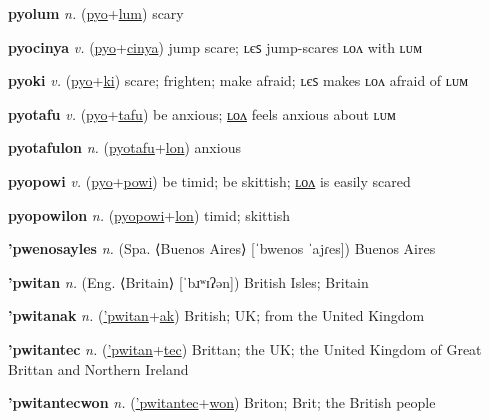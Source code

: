 \textbf{\hypertarget{pyolum}{pyolum}} \textit{n.} (\hyperlink{pyo}{pyo}+\allowbreak \hyperlink{lum}{lum})
scary

\textbf{\hypertarget{pyocinya}{pyocinya}} \textit{v.} (\hyperlink{pyo}{pyo}+\allowbreak \hyperlink{cinya}{cinya})
jump scare; ʟєꜱ jump-scares ʟᴏᴧ with ʟᴜᴍ

\textbf{\hypertarget{pyoki}{pyoki}} \textit{v.} (\hyperlink{pyo}{pyo}+\allowbreak \hyperlink{ki}{ki})
scare; frighten; make afraid; ʟєꜱ makes ʟᴏᴧ afraid of ʟᴜᴍ

\textbf{\hypertarget{pyotafu}{pyotafu}} \textit{v.} (\hyperlink{pyo}{pyo}+\allowbreak \hyperlink{tafu}{tafu})
be anxious; \hyperlink{pyotafulon}{ʟᴏᴧ} feels anxious about ʟᴜᴍ

\textbf{\hypertarget{pyotafulon}{pyotafulon}} \textit{n.} (\hyperlink{pyotafu}{pyotafu}+\allowbreak \hyperlink{lon}{lon})
anxious

\textbf{\hypertarget{pyopowi}{pyopowi}} \textit{v.} (\hyperlink{pyo}{pyo}+\allowbreak \hyperlink{powi}{powi})
be timid; be skittish; \hyperlink{pyopowilon}{ʟᴏᴧ} is easily scared

\textbf{\hypertarget{pyopowilon}{pyopowilon}} \textit{n.} (\hyperlink{pyopowi}{pyopowi}+\allowbreak \hyperlink{lon}{lon})
timid; skittish

\textbf{\hypertarget{'pwenosayles}{'pwenosayles}} \textit{n.} (Spa. ⟨Buenos Aires⟩ [ˈbwenos ˈajɾes])
Buenos Aires

\textbf{\hypertarget{'pwitan}{'pwitan}} \textit{n.} (Eng. ⟨Britain⟩ [ˈbɹʷɪʔən])
British Isles; Britain

\textbf{\hypertarget{'pwitanak}{'pwitanak}} \textit{n.} (\hyperlink{'pwitan}{'pwitan}+\allowbreak \hyperlink{ak}{ak})
British; UK; from the United Kingdom

\textbf{\hypertarget{'pwitantec}{'pwitantec}} \textit{n.} (\hyperlink{'pwitan}{'pwitan}+\allowbreak \hyperlink{tec}{tec})
Brittan; the UK; the United Kingdom of Great Brittan and Northern Ireland

\textbf{\hypertarget{'pwitantecwon}{'pwitantecwon}} \textit{n.} (\hyperlink{'pwitantec}{'pwitantec}+\allowbreak \hyperlink{won}{won})
Briton; Brit; the British people

